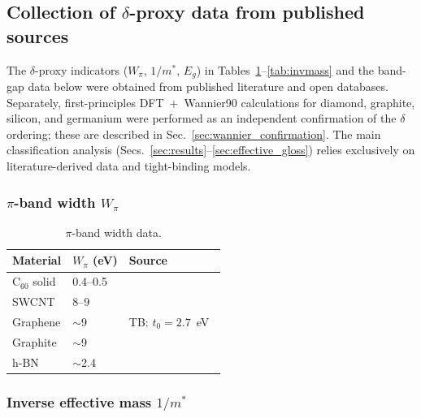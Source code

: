 \documentclass[twocolumn,showpacs,preprintnumbers,amsmath,amssymb,prb]{revtex4-2}
\begin{document}
\subsection{Collection of $\delta$-proxy data from published sources}

The $\delta$-proxy indicators ($W_\pi$, $1/m^*$, $E_g$) in
Tables~\ref{tab:bandwidth}--\ref{tab:invmass} and the band-gap data below were obtained from
published literature and open databases.
Separately, first-principles DFT~+~Wannier90 calculations for
diamond, graphite, silicon, and germanium were performed as an
independent confirmation of the $\delta$ ordering; these are described
in Sec.~\ref{sec:wannier_confirmation}. The main classification
analysis (Secs.~\ref{sec:results}--\ref{sec:effective_gloss}) relies
exclusively on literature-derived data and tight-binding models.

\subsubsection{$\pi$-band width $W_\pi$}

\begin{table}[h]
\caption{$\pi$-band width data.}
\label{tab:bandwidth}
\begin{ruledtabular}
\begin{tabular}{lll}
  Material & $W_\pi$ (eV) & Source \\
  \hline
  C$_{60}$ solid & 0.4--0.5 & \cite{Gunnarsson1997} \\
  SWCNT & 8--9 & \cite{Reich2002} \\
  Graphene & $\sim$9 & TB: $t_0 = 2.7$~eV~\cite{Saito1998} \\
  Graphite & $\sim$9 & \cite{Reich2002} \\
  h-BN & $\sim$2.4 & \cite{Wirtz2005} \\
\end{tabular}
\end{ruledtabular}
\end{table}

\subsubsection{Inverse effective mass $1/m^*$}
\end{document}
